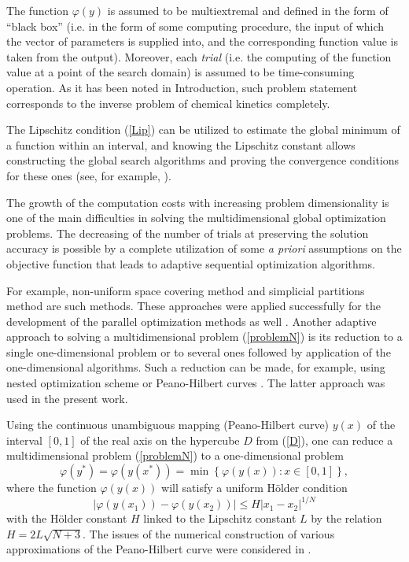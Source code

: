 \documentclass{svproc}
\begin{document}
The function $\varphi(y)$ is assumed to be multiextremal and defined in the form of ``black box'' (i.e. in the form of some computing procedure, the input of which the  vector of parameters is supplied into, and the corresponding function value is taken from the output). Moreover, each \textit{trial} (i.e. the computing of the function value at a point of the search domain) is assumed to be time-consuming operation. 
As it has been noted in Introduction, such problem statement corresponds to the inverse problem of chemical kinetics completely.

The Lipschitz condition (\ref{Lip}) can be utilized to estimate the global minimum of a function within an interval, and knowing the Lipschitz constant allows constructing the global search algorithms and proving the convergence conditions for these ones (see, for example, \cite{Strongin2000}).

The growth of the computation costs with increasing problem dimensionality is one of the main difficulties in solving the multidimensional global optimization problems. The decreasing of the number of trials at preserving the solution accuracy is possible by a complete utilization of some {\it a priori} assumptions on the objective function that leads to adaptive sequential optimization algorithms.

For example, non-uniform space covering method \cite{Evtushenko2013} and simplicial partitions method \cite{Zilinskas2010} are such methods. These approaches were applied successfully for the development of the parallel optimization methods as well \cite{Evtushenko2009,Paulavicius2011}. 
Another adaptive approach to solving a multidimensional problem (\ref{problemN}) is its reduction to a single one-dimensional problem or to several ones followed by application of the one-dimensional algorithms. 
Such a reduction can be made, for example, using nested optimization scheme \cite{Grishagin2018} or Peano-Hilbert curves \cite{Barkalov2018}. 
The latter approach was used in the present work.

Using the continuous unambiguous mapping (Peano-Hilbert curve) $y(x)$ of the interval $[0,1]$ of the real axis on the hypercube $D$ from (\ref{D}), one can reduce a multidimensional problem (\ref{problemN}) to a one-dimensional problem
\[
\varphi(y^\ast)=\varphi(y(x^\ast))=\min{\left\{\varphi(y(x)): x\in[0,1]\right\}},
\]
where the function $\varphi(y(x))$ will satisfy a uniform H{\"o}lder condition
\[
\left|\varphi(y(x_1))-\varphi(y(x_2))\right|\leq H\left|x_1-x_2\right|^{1/N}
\]
with the H{\"o}lder constant $H$ linked to the Lipschitz constant $L$ by the relation $ H=2 L \sqrt{N+3}$. 
The issues of the numerical construction of various approximations of the Peano-Hilbert curve were considered in \cite{Strongin2000,Sergeyev2013}.
\end{document}
